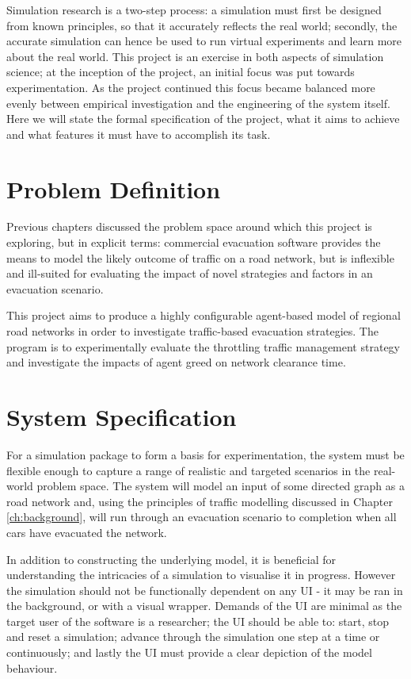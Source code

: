 Simulation research is a two-step process: a simulation must first be designed from known principles, so that it accurately reflects the real world; secondly, the accurate simulation can hence be used to run virtual experiments and learn more about the real world. This project is an exercise in both aspects of simulation science; at the inception of the project, an initial focus was put towards experimentation.  As the project continued this focus became balanced more evenly between empirical investigation and the engineering of the system itself. Here we will state the formal specification of the project, what it aims to achieve and what features it must have to accomplish its task.

\section{Problem Definition}

Previous chapters discussed the problem space around which this project is exploring, but in explicit terms: commercial evacuation software provides the means to model the likely outcome of traffic on a road network, but is inflexible and ill-suited for evaluating the impact of novel strategies and factors in an evacuation scenario. 

This project aims to produce a highly configurable agent-based model of regional road networks in order to investigate traffic-based evacuation strategies. The program is to experimentally evaluate the throttling traffic management strategy and investigate the impacts of agent greed on network clearance time.

\section{System Specification}

For a simulation package to form a basis for experimentation, the system must be flexible enough to capture a range of realistic and targeted scenarios in the real-world problem space. The system will model an input of some directed graph as a road network and, using the principles of traffic modelling discussed in Chapter \ref{ch:background}, will run through an evacuation scenario to completion when all cars have evacuated the network.

In addition to constructing the underlying model, it is beneficial for understanding the intricacies of a simulation to visualise it in progress. However the simulation should not be functionally dependent on any UI -  it may be ran in the background, or with a visual wrapper. Demands of the UI are minimal as the target user of the software is a researcher; the UI should be able to: start, stop and reset a simulation; advance through the simulation one step at a time or continuously; and lastly the UI must provide a clear depiction of the model behaviour.

